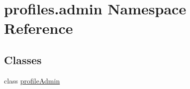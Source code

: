 \hypertarget{namespaceprofiles_1_1admin}{}\section{profiles.\+admin Namespace Reference}
\label{namespaceprofiles_1_1admin}
\subsection*{Classes}
\begin{DoxyCompactItemize}
\item 
class \hyperlink{classprofiles_1_1admin_1_1profileAdmin}{profile\+Admin}
\end{DoxyCompactItemize}
